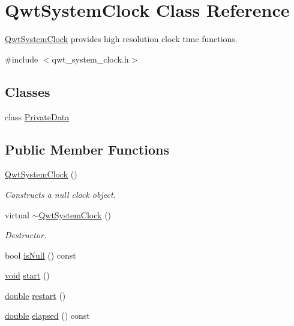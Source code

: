 \hypertarget{class_qwt_system_clock}{\section{Qwt\-System\-Clock Class Reference}
\label{class_qwt_system_clock}
}


\hyperlink{class_qwt_system_clock}{Qwt\-System\-Clock} provides high resolution clock time functions.  




{\ttfamily \#include $<$qwt\-\_\-system\-\_\-clock.\-h$>$}

\subsection*{Classes}
\begin{DoxyCompactItemize}
\item 
class \hyperlink{class_qwt_system_clock_1_1_private_data}{Private\-Data}
\end{DoxyCompactItemize}
\subsection*{Public Member Functions}
\begin{DoxyCompactItemize}
\item 
\hyperlink{class_qwt_system_clock_a384e20d6049376575bf28306154854fd}{Qwt\-System\-Clock} ()
\begin{DoxyCompactList}\small\item\em Constructs a null clock object. \end{DoxyCompactList}\item 
virtual \hyperlink{class_qwt_system_clock_a79a46a34a317543a08a8424a333b9ee3}{$\sim$\-Qwt\-System\-Clock} ()
\begin{DoxyCompactList}\small\item\em Destructor. \end{DoxyCompactList}\item 
bool \hyperlink{class_qwt_system_clock_a5432c09607488f9bb7e3d7592518efb1}{is\-Null} () const 
\item 
\hyperlink{group___u_a_v_objects_plugin_ga444cf2ff3f0ecbe028adce838d373f5c}{void} \hyperlink{class_qwt_system_clock_a3408bd55b49582f7847865aacc7beb37}{start} ()
\item 
\hyperlink{_super_l_u_support_8h_a8956b2b9f49bf918deed98379d159ca7}{double} \hyperlink{class_qwt_system_clock_a6be327dd133c1d7ecccfb95050eef7b9}{restart} ()
\item 
\hyperlink{_super_l_u_support_8h_a8956b2b9f49bf918deed98379d159ca7}{double} \hyperlink{class_qwt_system_clock_a0baae39a5a9d4f4e8bf3a8bd308a6dad}{elapsed} () const 
\end{DoxyCompactItemize}
